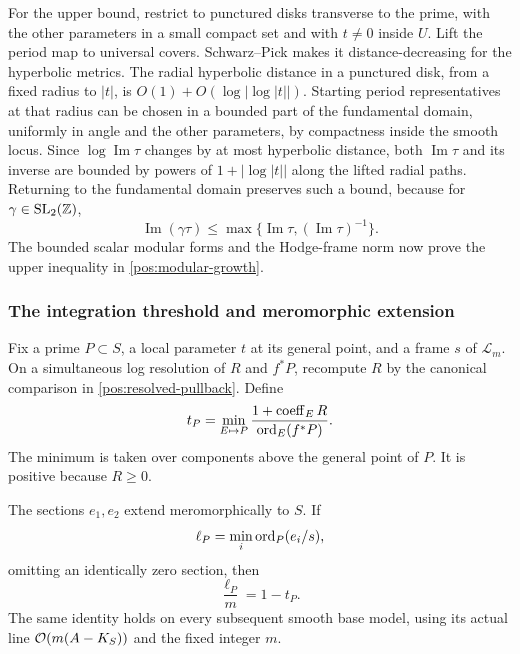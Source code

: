 For the upper bound, restrict to punctured disks transverse to the
prime, with the other parameters in a small compact set and with
\(t\ne0\) inside \(U\). Lift the period map to universal covers.
Schwarz--Pick makes it distance-decreasing for the hyperbolic metrics.
The radial hyperbolic distance in a punctured disk, from a fixed
radius to \(|t|\), is
\(O(1)+O(\log|\log|t||)\). Starting period representatives at that
radius can be chosen in a bounded part of the fundamental domain,
uniformly in angle and the other parameters, by compactness inside
the smooth locus. Since \(\log\operatorname{Im}\tau\) changes by
at most hyperbolic distance, both \(\operatorname{Im}\tau\) and its
inverse are bounded by powers of \(1+|\log|t||\) along the lifted
radial paths. Returning to the fundamental domain preserves such a
bound, because for \(\gamma\in\mathrm{SL}_2(\mathbb{Z})\),
\[
 \operatorname{Im}(\gamma\tau)
 \leq\max\{\operatorname{Im}\tau,(\operatorname{Im}\tau)^{-1}\}.
\]
The bounded scalar modular forms and the Hodge-frame norm now prove
the upper inequality in \eqref{pos:modular-growth}.

\subsubsection{The integration threshold and meromorphic extension}

Fix a prime \(P\subset S\), a local parameter \(t\) at its general
point, and a frame \(s\) of \(\mathcal L_m\). On a simultaneous log
resolution of \(R\) and \(f^*P\), recompute \(R\) by the canonical
comparison in \eqref{pos:resolved-pullback}. Define
\begin{equation}\label{pos:threshold-definition}
 t_P=\min_{E\mapsto P}
 \frac{1+\operatorname{coeff}_E R}{\operatorname{ord}_E(f^*P)}.
\end{equation}
The minimum is taken over components above the general point of
\(P\). It is positive because \(R\geq0\).

\begin{lemma}\label{pos:order-identity}
The sections \(e_1,e_2\) extend meromorphically to \(S\). If
\[
 \ell_P=\min_i\operatorname{ord}_P(e_i/s),
\]
omitting an identically zero section, then
\begin{equation}\label{pos:modular-order}
 \frac{\ell_P}{m}=1-t_P.
\end{equation}
The same identity holds on every subsequent smooth base model, using
its actual line \(\mathcal{O}(m(A-K_S))\) and the fixed integer \(m\).
\end{lemma}

